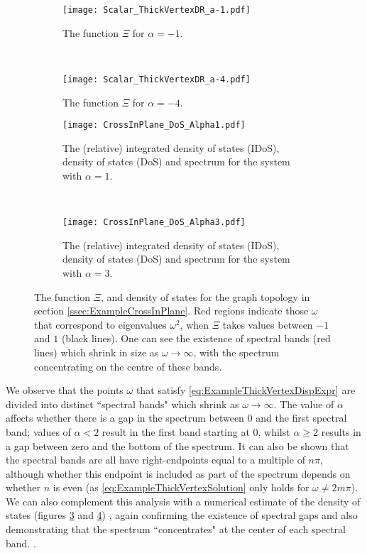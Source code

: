 \begin{figure}[t!]
	\centering
	\begin{subfigure}[t]{0.45\textwidth}
		\centering
		\texttt{[image: Scalar\_ThickVertexDR\_a-1.pdf]}
		\caption{\label{fig:Scalar_ThickVertexDR_a-1} The function $\Xi$ for $\alpha=-1$.}
	\end{subfigure}
	~
	\begin{subfigure}[t]{0.45\textwidth}
		\centering
		\texttt{[image: Scalar\_ThickVertexDR\_a-4.pdf]}
		\caption{\label{fig:Scalar_ThickVertexDR_a-4} The function $\Xi$ for $\alpha=-4$.}
	\end{subfigure}
	\newline
	\begin{subfigure}[t]{0.45\textwidth}
		\centering
		\texttt{[image: CrossInPlane\_DoS\_Alpha1.pdf]}
		\caption{\label{fig:CrossInPlane_DoS_Alpha1} The (relative) integrated density of states (IDoS), density of states (DoS) and spectrum for the system with $\alpha=1$.}
	\end{subfigure}
	~
	\begin{subfigure}[t]{0.45\textwidth}
		\centering
		\texttt{[image: CrossInPlane\_DoS\_Alpha3.pdf]}
		\caption{\label{fig:CrossInPlane_DoS_Alpha3} The (relative) integrated density of states (IDoS), density of states (DoS) and spectrum for the system with $\alpha=3$.}
	\end{subfigure}	
	\caption{\label{fig:Scalar_ThickVertexAllResults} The function $\Xi$, and density of states for the graph topology in section \ref{ssec:ExampleCrossInPlane}.
	Red regions indicate those $\omega$ that correspond to eigenvalues $\omega^2$, when $\Xi$ takes values between $-1$ and $1$ (black lines).
	One can see the existence of spectral bands (red lines) which shrink in size as $\omega\rightarrow\infty$, with the spectrum concentrating on the centre of these bands.}
\end{figure}
We observe that the points $\omega$ that satisfy \eqref{eq:ExampleThickVertexDispExpr} are divided into distinct ``spectral bands" which shrink as $\omega\rightarrow\infty$.
The value of $\alpha$ affects whether there is a gap in the spectrum between 0 and the first spectral band; values of $\alpha<2$ result in the first band starting at 0, whilst $\alpha\geq 2$ results in a gap between zero and the bottom of the spectrum.
It can also be shown that the spectral bands are all have right-endpoints equal to a multiple of $n\pi$, although whether this endpoint is included as part of the spectrum depends on whether $n$ is even (as \eqref{eq:ExampleThickVertexSolution} only holds for $\omega\neq 2m\pi$).
We can also complement this analysis with a numerical estimate of the density of states (figures \ref{fig:CrossInPlane_DoS_Alpha1} and \ref{fig:CrossInPlane_DoS_Alpha3}) , again confirming the existence of spectral gaps and also demonstrating that the spectrum ``concentrates" at the center of each spectral band.
.